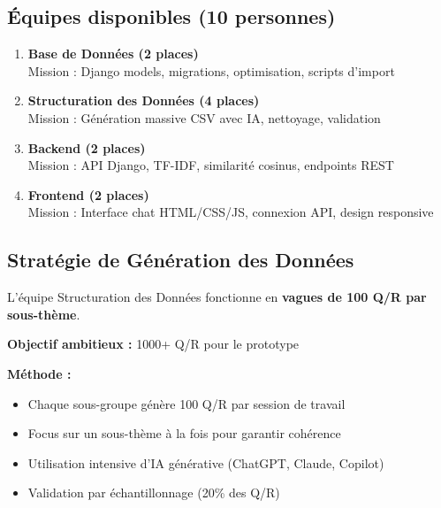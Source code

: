 \documentclass[11pt,a4paper]{article}
\begin{document}
\subsection{Équipes disponibles (10 personnes)}

\begin{enumerate}
    \item \textbf{Base de Données (2 places)} \\
    Mission : Django models, migrations, optimisation, scripts d'import
    
    \item \textbf{Structuration des Données (4 places)} \\
    Mission : Génération massive CSV avec IA, nettoyage, validation
    
    \item \textbf{Backend (2 places)} \\
    Mission : API Django, TF-IDF, similarité cosinus, endpoints REST
    
    \item \textbf{Frontend (2 places)} \\
    Mission : Interface chat HTML/CSS/JS, connexion API, design responsive
\end{enumerate}

\subsection{Stratégie de Génération des Données}

\begin{important}
L'équipe Structuration des Données fonctionne en \textbf{vagues de 100 Q/R par sous-thème}.

\textbf{Objectif ambitieux :} 1000+ Q/R pour le prototype

\textbf{Méthode :}
\begin{itemize}
    \item Chaque sous-groupe génère 100 Q/R par session de travail
    \item Focus sur un sous-thème à la fois pour garantir cohérence
    \item Utilisation intensive d'IA générative (ChatGPT, Claude, Copilot)
    \item Validation par échantillonnage (20\% des Q/R)
\end{itemize}
\end{important}

\clearpage
\end{document}
